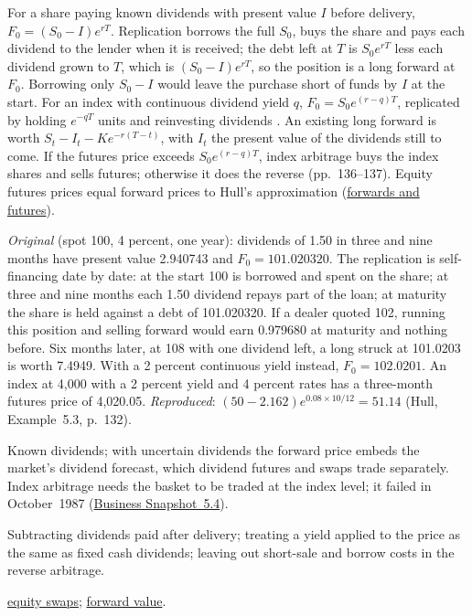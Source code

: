 \begin{qfmethod}\label{meth:equity-forward-futures-valuation}
 For a share paying known dividends with present value $I$ before delivery, $F_0=(S_0-I)e^{rT}$. Replication borrows the full $S_0$, buys the share and pays each dividend to the lender when it is received; the debt left at $T$ is $S_0e^{rT}$ less each dividend grown to $T$, which is $(S_0-I)e^{rT}$, so the position is a long forward at $F_0$. Borrowing only $S_0-I$ would leave the purchase short of funds by $I$ at the start. For an index with continuous dividend yield $q$, $F_0=S_0e^{(r-q)T}$, replicated by holding $e^{-qT}$ units and reinvesting dividends \citep[chap.~5, secs.~5.5--5.6 and~5.9, pp.~130--132 and~135--137]{s7-hulloptions}. An existing long forward is worth $S_t-I_t-Ke^{-r(T-t)}$, with $I_t$ the present value of the dividends still to come. If the futures price exceeds $S_0e^{(r-q)T}$, index arbitrage buys the index shares and sells futures; otherwise it does the reverse (pp.~136--137). Equity futures prices equal forward prices to Hull's approximation (\hyperref[res:forward-futures-price-difference]{forwards and futures}).

 \emph{Original} (spot 100, 4 percent, one year): dividends of 1.50 in three and nine months have present value 2.940743 and $F_0=101.020320$. The replication is self-financing date by date: at the start 100 is borrowed and spent on the share; at three and nine months each 1.50 dividend repays part of the loan; at maturity the share is held against a debt of 101.020320. If a dealer quoted 102, running this position and selling forward would earn 0.979680 at maturity and nothing before. Six months later, at 108 with one dividend left, a long struck at 101.0203 is worth 7.4949. With a 2 percent continuous yield instead, $F_0=102.0201$. An index at 4{,}000 with a 2 percent yield and 4 percent rates has a three-month futures price of 4{,}020.05. \emph{Reproduced}: $(50-2.162)e^{0.08\times10/12}=51.14$ (Hull, Example~5.3, p.~132).

 Known dividends; with uncertain dividends the forward price embeds the market's dividend forecast, which dividend futures and swaps trade separately. Index arbitrage needs the basket to be traded at the index level; it failed in October~1987 (\hyperref[res:cost-of-carry-forward-price]{Business Snapshot~5.4}).

 Subtracting dividends paid after delivery; treating a yield applied to the price as the same as fixed cash dividends; leaving out short-sale and borrow costs in the reverse arbitrage.

 \hyperref[meth:swap-valuation-replication]{equity swaps}; \hyperref[meth:forward-price-value-lifecycle]{forward value}.

\end{qfmethod}


